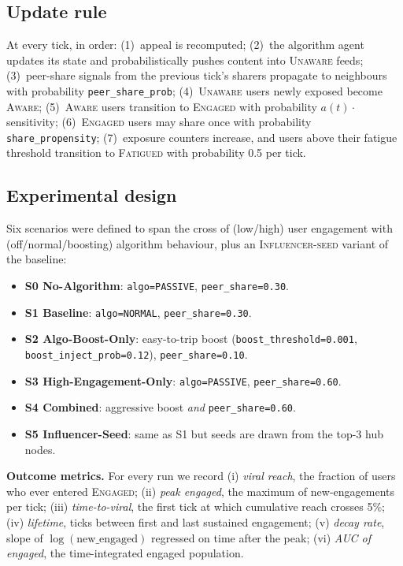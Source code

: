 \documentclass[sigconf, nonacm]{acmart}
\begin{document}
\subsection{Update rule}
At every tick, in order: (1)~appeal is recomputed; (2)~the algorithm
agent updates its state and probabilistically pushes content into
\textsc{Unaware} feeds; (3)~peer-share signals from the previous tick's
sharers propagate to neighbours with probability
\texttt{peer\_share\_prob}; (4)~\textsc{Unaware} users newly exposed
become \textsc{Aware}; (5)~\textsc{Aware} users transition to
\textsc{Engaged} with probability $a(t)\cdot{}$sensitivity;
(6)~\textsc{Engaged} users may share once with probability
\texttt{share\_propensity}; (7)~exposure counters increase, and users
above their fatigue threshold transition to \textsc{Fatigued} with
probability 0.5 per tick.

\subsection{Experimental design}
Six scenarios were defined to span the cross of (low/high) user
engagement with (off/normal/boosting) algorithm behaviour, plus an
\textsc{Influencer-seed} variant of the baseline:

\begin{itemize}
  \item \textbf{S0  No-Algorithm}: \texttt{algo=PASSIVE},
    \texttt{peer\_share=0.30}.
  \item \textbf{S1  Baseline}: \texttt{algo=NORMAL},
    \texttt{peer\_share=0.30}.
  \item \textbf{S2  Algo-Boost-Only}: easy-to-trip boost
    (\texttt{boost\_threshold=0.001},
    \texttt{boost\_inject\_prob=0.12}), \texttt{peer\_share=0.10}.
  \item \textbf{S3  High-Engagement-Only}: \texttt{algo=PASSIVE},
    \texttt{peer\_share=0.60}.
  \item \textbf{S4  Combined}: aggressive boost \emph{and}
    \texttt{peer\_share=0.60}.
  \item \textbf{S5  Influencer-Seed}: same as S1 but seeds are drawn
    from the top-3 hub nodes.
\end{itemize}

\noindent
\textbf{Outcome metrics.}
For every run we record (i) \emph{viral reach}, the fraction of users
who ever entered \textsc{Engaged}; (ii) \emph{peak engaged}, the maximum
of new-engagements per tick; (iii) \emph{time-to-viral}, the first tick
at which cumulative reach crosses 5\%; (iv) \emph{lifetime}, ticks
between first and last sustained engagement; (v) \emph{decay rate}, slope
of $\log(\text{new\_engaged})$ regressed on time after the peak;
(vi) \emph{AUC of engaged}, the time-integrated engaged population.
\end{document}
